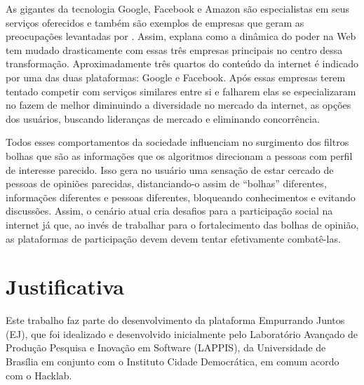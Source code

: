 
As gigantes da tecnologia Google, Facebook e Amazon são especialistas em seus serviços oferecidos e também são exemplos de empresas que geram as preocupações levantadas por  \cite{berners2017}. Assim, \cite{staltz2017} explana como a dinâmica do poder na Web tem mudado drasticamente com essas três empresas principais no centro dessa transformação. %
Aproximadamente três quartos do conteúdo da internet é indicado por uma das duas plataformas: Google e Facebook.
Após essas empresas terem tentado competir com serviços similares entre si e falharem%
 elas se especializaram no fazem de melhor diminuindo a diversidade no mercado da internet, as opções dos usuários, buscando lideranças de mercado e eliminando concorrência.

Todos esses comportamentos da sociedade influenciam no surgimento dos filtros bolhas que são as informações que os algoritmos direcionam a pessoas com perfil de interesse parecido. Isso gera no usuário uma sensação de estar cercado de pessoas de opiniões parecidas, distanciando-o assim de “bolhas” diferentes, informações diferentes e pessoas diferentes, bloqueando conhecimentos e evitando discussões. Assim, o cenário atual cria desafios para a participação social na internet já que, ao invés de trabalhar para o fortalecimento das bolhas de opinião, as plataformas de participação devem devem tentar efetivamente combatê-las.

\section{Justificativa}

Este trabalho faz parte do desenvolvimento da plataforma Empurrando Juntos (EJ), que foi idealizado e desenvolvido inicialmente pelo Laboratório Avançado de Produção Pesquisa e Inovação em Software (LAPPIS), da Universidade de Brasília em conjunto com o Instituto Cidade Democrática, em comum acordo com o Hacklab. 

